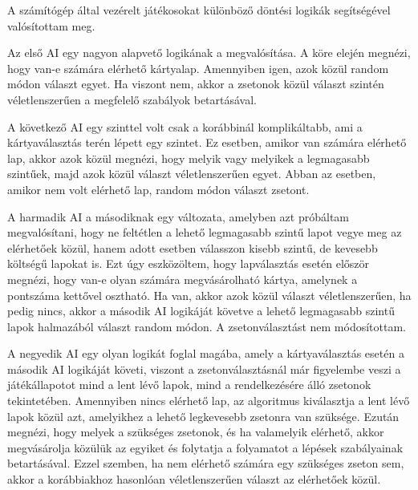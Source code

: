 
A számítógép által vezérelt játékosokat különböző döntési logikák segítségével valósítottam meg.


Az első AI egy nagyon alapvető logikának a megvalósítása. A köre elején megnézi, hogy van-e számára elérhető kártyalap. Amennyiben igen, azok közül random módon választ egyet. Ha viszont nem, akkor a zsetonok közül választ szintén véletlenszerűen a megfelelő szabályok betartásával.


A következő AI egy szinttel volt csak a korábbinál komplikáltabb, ami a kártyaválasztás terén lépett egy szintet. Ez esetben, amikor van számára elérhető lap, akkor azok közül megnézi, hogy melyik vagy melyikek a legmagasabb szintűek, majd azok közül választ véletlenszerűen egyet. Abban az esetben, amikor nem volt elérhető lap, random módon választ zsetont.


A harmadik AI a másodiknak egy változata, amelyben azt próbáltam megvalósítani, hogy ne feltétlen a lehető legmagasabb szintű lapot vegye meg az elérhetőek közül, hanem adott esetben válasszon kisebb szintű, de kevesebb költségű lapokat is. Ezt úgy eszközöltem, hogy lapválasztás esetén először megnézi, hogy van-e olyan számára megvásárolható kártya, amelynek a pontszáma kettővel osztható. Ha van, akkor azok közül választ véletlenszerűen, ha pedig nincs, akkor a második AI logikáját követve a lehető legmagasabb szintű lapok halmazából választ random módon. A zsetonválasztást nem módosítottam.

\newpage


A negyedik AI egy olyan logikát foglal magába, amely a kártyaválasztás esetén a második AI logikáját követi, viszont a zsetonválasztásnál már figyelembe veszi a játékállapotot mind a lent lévő lapok, mind a rendelkezésére álló zsetonok tekintetében. Amennyiben nincs elérhető lap, az algoritmus kiválasztja a lent lévő lapok közül azt, amelyikhez a lehető legkevesebb zsetonra van szüksége. Ezután megnézi, hogy melyek a szükséges zsetonok, és ha valamelyik elérhető, akkor megvásárolja közülük az egyiket és folytatja a folyamatot a lépések szabályainak betartásával. Ezzel szemben, ha nem elérhető számára egy szükséges zseton sem, akkor a korábbiakhoz hasonlóan véletlenszerűen választ az elérhetőek közül.

